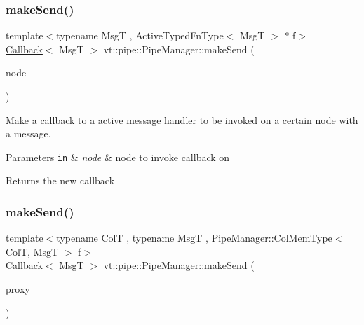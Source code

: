 \subsubsection{\texorpdfstring{make\+Send()}{makeSend()}\hspace{0.1cm}{\footnotesize\ttfamily [3/6]}}
{\footnotesize\ttfamily template$<$typename MsgT , Active\+Typed\+Fn\+Type$<$ Msg\+T $>$ $\ast$ f$>$ \\
\hyperlink{namespacevt_a57b238783d05de96bc2c4027f7073b7f}{Callback}$<$ MsgT $>$ vt\+::pipe\+::\+Pipe\+Manager\+::make\+Send (\begin{DoxyParamCaption}\item[{\hyperlink{namespacevt_a866da9d0efc19c0a1ce79e9e492f47e2}{Node\+Type} const \&}]{node }\end{DoxyParamCaption})}



Make a callback to a active message handler to be invoked on a certain node with a message. 


\begin{DoxyParams}[1]{Parameters}
\mbox{\tt in}  & {\em node} & node to invoke callback on\\
\hline
\end{DoxyParams}
\begin{DoxyReturn}{Returns}
the new callback 
\end{DoxyReturn}
\mbox{\label{structvt_1_1pipe_1_1_pipe_manager_a612b59953b949edc575577e313e3b187}} 
\subsubsection{\texorpdfstring{make\+Send()}{makeSend()}\hspace{0.1cm}{\footnotesize\ttfamily [4/6]}}
{\footnotesize\ttfamily template$<$typename ColT , typename MsgT , Pipe\+Manager\+::\+Col\+Mem\+Type$<$ Col\+T, Msg\+T $>$ f$>$ \\
\hyperlink{namespacevt_a57b238783d05de96bc2c4027f7073b7f}{Callback}$<$ MsgT $>$ vt\+::pipe\+::\+Pipe\+Manager\+::make\+Send (\begin{DoxyParamCaption}\item[{typename Col\+T\+::\+Proxy\+Type}]{proxy }\end{DoxyParamCaption})}



